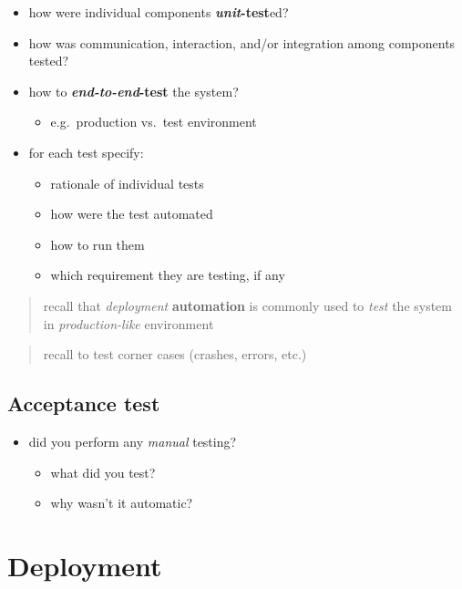 \documentclass{scrartcl}
\begin{document}
\begin{itemize}
  \item how were individual components \textbf{\emph{unit}-test}ed?
  
  \item how was communication, interaction, and/or integration among components tested?
  
  \item how to \textbf{\emph{end-to-end}-test} the system?
  \begin{itemize}
    \item e.g.~production vs.~test environment
  \end{itemize}

  \item for each test specify:
  \begin{itemize}
    \item rationale of individual tests
    \item how were the test automated
    \item how to run them
    \item which requirement they are testing, if any
  \end{itemize}
\end{itemize}

\begin{quote}
recall that \emph{deployment} \textbf{automation} is commonly used to \emph{test} the system in \emph{production-like} environment
\end{quote}

\begin{quote}
recall to test corner cases (crashes, errors, etc.)
\end{quote}

\subsection{Acceptance test}\label{acceptance-test}

\begin{itemize}
  \item did you perform any \emph{manual} testing?
  \begin{itemize}
    \item what did you test?
    \item why wasn't it automatic?
  \end{itemize}
\end{itemize}

\section{Deployment}\label{deployment}
\end{document}
